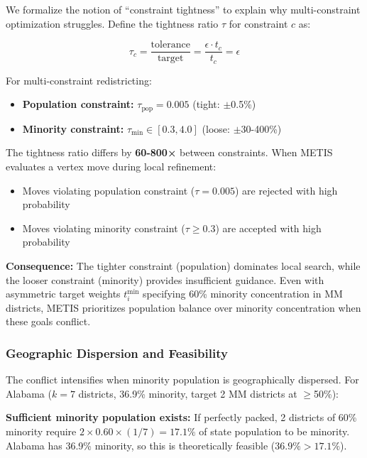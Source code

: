 We formalize the notion of ``constraint tightness'' to explain why multi-constraint optimization struggles. Define the tightness ratio $\tau$ for constraint $c$ as:

\begin{equation}
\tau_c = \frac{\text{tolerance}}{\text{target}} = \frac{\epsilon \cdot t_c}{t_c} = \epsilon
\end{equation}

For multi-constraint redistricting:
\begin{itemize}
    \item \textbf{Population constraint:} $\tau_{\text{pop}} = 0.005$ (tight: $\pm$0.5\%)
    \item \textbf{Minority constraint:} $\tau_{\text{min}} \in [0.3, 4.0]$ (loose: $\pm$30-400\%)
\end{itemize}

The tightness ratio differs by \textbf{60-800×} between constraints. When METIS evaluates a vertex move during local refinement:
\begin{itemize}
    \item Moves violating population constraint ($\tau = 0.005$) are rejected with high probability
    \item Moves violating minority constraint ($\tau \geq 0.3$) are accepted with high probability
\end{itemize}

\textbf{Consequence:} The tighter constraint (population) dominates local search, while the looser constraint (minority) provides insufficient guidance. Even with asymmetric target weights $t_i^{\text{min}}$ specifying 60\% minority concentration in MM districts, METIS prioritizes population balance over minority concentration when these goals conflict.

\subsubsection{Geographic Dispersion and Feasibility}

The conflict intensifies when minority population is geographically dispersed. For Alabama ($k=7$ districts, 36.9\% minority, target 2 MM districts at $\geq$50\%):

\textbf{Sufficient minority population exists:} If perfectly packed, 2 districts of 60\% minority require $2 \times 0.60 \times (1/7) = 17.1\%$ of state population to be minority. Alabama has 36.9\% minority, so this is theoretically feasible ($36.9\% > 17.1\%$).


